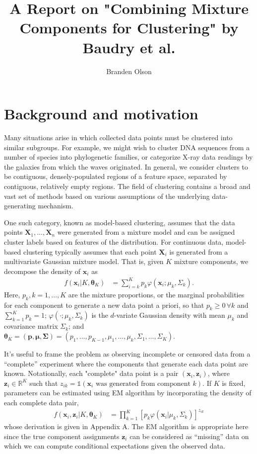 \documentclass[11pt]{article}
\newcommand*\reals{\mathbb{R}}
\newcommand*\ba{\[ \begin{aligned}}
\newcommand*\ea{\end{aligned} \]}
\newcommand*\ind[1]{\mathbb{1}\left(#1\right)}
\newcommand*\bp{\mathbf{p}}
\newcommand*\bx{\mathbf{x}}
\newcommand*\bX{\mathbf{X}}
\newcommand*\bz{\mathbf{z}}
\newcommand*\btheta{\boldsymbol{\theta}}
\newcommand*\bmu{\boldsymbol{\mu}}
\newcommand*\bSigma{\boldsymbol{\Sigma}}
\renewcommand\;{\,}
\renewcommand\phi{\varphi}
\begin{document}
\title{A Report on "Combining Mixture Components for Clustering" by Baudry et al.}
\author{Branden Olson}
\date{}
\maketitle

\section{Background and motivation} 
Many situations arise in which collected data points must be clustered into similar subgroups. 
For example, we might wish to cluster DNA sequences from a number of species into phylogenetic families, or categorize X-ray data readings by the galaxies from which the waves originated.
In general, we consider clusters to be contiguous, densely-populated regions of a feature space, separated by contiguous, relatively empty regions.
The field of clustering contains a broad and vast set of methods based on various assumptions of the underlying data-generating mechanism.

One such category, known as model-based clustering, assumes that the data points 
$\bX_1, \dotsc, \bX_n$ were generated from a mixture model and can be assigned cluster labels based on features of the distribution.
For continuous data, model-based clustering typically assumes that each point $\bX_i$ is generated from a multivariate Gaussian mixture model. 
That is, given $K$ mixture components, we decompose the density of $\bx_i$ as
\ba
f(\bx_i | K, \btheta_K)
	& = \sum_{i=k}^K p_k \phi \left(\bx_i ; \mu_k, \Sigma_k \right).
\ea
Here, $p_k, k = 1, \dotsc, K$ are the mixture proportions, or the marginal probabilities for each component to generate a new data point a priori, so that $p_k \ge 0 \; \forall k$ and $\sum_{k=1}^K p_k = 1$; $\phi(\cdot; \mu_k, \Sigma_k)$ is the $d$-variate Gaussian density with mean $\mu_k$ and covariance matrix $\Sigma_k$; and $\btheta_K = (\bp, \bmu, \bSigma) = (p_1, \dotsc, p_{K - 1}, \mu_1, \dotsc, \mu_k, \Sigma_1, \dotsc, \Sigma_K)$.

It's useful to frame the problem as observing incomplete or censored data from a ``complete'' experiment where the components that generate each data point are known. Notationally, each "complete" data point is a pair $(\bx_i, \bz_i)$, where 
$\bz_i \in \reals^K$ such that $z_{ik} = \ind{\bx_i \text{ was generated from component $k$}}$.  
If $K$ is fixed, parameters can be estimated using EM algorithm by incorporating the density of each complete data pair,
\ba
f(\bx_i, \bz_i | K, \btheta_K)
	& = \prod_{k=1}^K \left[ p_k \phi(\bx_i | \mu_k, \Sigma_k) \right]^{z_{ik}}
\ea
whose derivation is given in Appendix A.
The EM algorithm is appropriate here since the true component assignments $\bz_i$ can be considered as ``missing'' data on which we can compute conditional expectations given the observed data.
\end{document}

